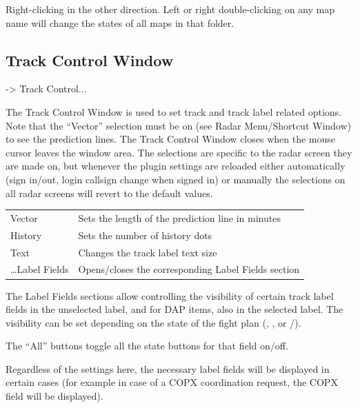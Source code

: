 \documentclass[a4paper,oneside,11pt]{memoir}
\begin{document}
\bigskip

Right-clicking in the other direction. Left or right double-clicking on any map name will change the states of all maps in that folder.

\subsection{Track Control Window}
\label{win:tcw}

 -> Track Control...

\bigskip

The Track Control Window is used to set track and track label related options. Note that the “Vector” selection must be on (see Radar Menu/Shortcut Window) to see the prediction lines. The Track Control Window closes when the mouse cursor leaves the window area. The selections are specific to the radar screen they are made on, but whenever the plugin settings are reloaded either automatically (sign in/out, login callsign change when signed in) or manually the selections on all radar screens will revert to the default values.


\begin{longtable}{p{2.5cm} p{10cm}}
    Vector          & Sets the length of the prediction line in minutes\\
    History         & Sets the number of history dots\\
    Text            & Changes the track label text size\\
    …Label Fields   & Opens/closes the corresponding Label Fields section\\
\end{longtable}

\bigskip

The Label Fields sections allow controlling the visibility of certain track label fields in the unselected label, and for DAP items, also in the selected label. The visibility can be set depending on the state of the fight plan (, ,  or /).

\bigskip

The “All” buttons toggle all the state buttons for that field on/off.

\bigskip

Regardless of the settings here, the necessary label fields will be displayed in certain cases (for example in case of a COPX coordination request, the COPX field will be displayed).
\end{document}
